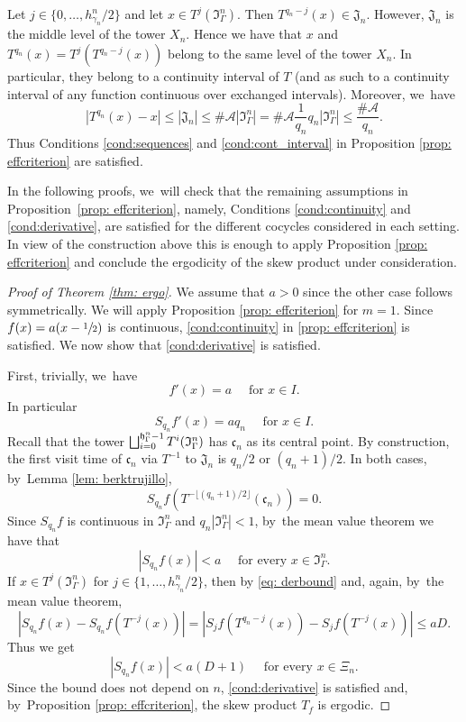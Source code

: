 \documentclass[10pt,a4paper]{amsart}
\let\oldbigsqcup\bigsqcup
\renewcommand{\bigsqcup}{\mathop{\textstyle\oldbigsqcup}\displaylimits}
\theoremstyle{plain}
\theoremstyle{definition}
\newcommand{\A}{\mathcal{A}}
\begin{document}
Let $j\in\{0,\ldots,h_{\gamma_n}^n/2\}$ and let $x\in T^j(\mathfrak I_{\Gamma}^n)$. Then $T^{q_n-j}(x)\in \mathfrak J_n$. However, $\mathfrak J_n$ is the middle level of the tower $X_n$. Hence we have that $x$
and $T^{q_n}(x)=T^{j}(T^{q_n-j}(x))$ belong to the same level of the tower $X_n$. In particular, they belong to a continuity interval of $T$ (and as such to a continuity interval of any function continuous over exchanged intervals). Moreover, we~have
\[
|T^{q_n}(x)-x|\le |\mathfrak J_n|\le \#\A|\mathfrak I_{\Gamma}^n|=
\#\A\frac{1}{q_n} q_n|\mathfrak I_{\Gamma}^n|\le \frac{\#\A}{q_n}.
\]
Thus Conditions \eqref{cond:sequences} and \eqref{cond:cont_interval} in Proposition \ref{prop: effcriterion} are satisfied.

In the following proofs, we~will check that the remaining assumptions in Proposition~\ref{prop: effcriterion}, namely, Conditions \eqref{cond:continuity} and \eqref{cond:derivative}, are satisfied for the different cocycles considered in each setting. In view of the construction above this is enough to apply Proposition \ref{prop: effcriterion} and conclude the ergodicity of the skew product under consideration.

\begin{proof}[Proof of Theorem \ref{thm: ergo}]
We assume that $a>0$ since the other case follows symmetrically. We will apply Proposition \ref{prop: effcriterion} for $m=1$. Since $f(x)=a(x-\sfrac{1}{2})$ is continuous, \eqref{cond:continuity} in \ref{prop: effcriterion} is satisfied. We now show that \eqref{cond:derivative} is satisfied.

First, trivially, we~have
\[
f'(x)=a\quad\text{ for }x\in I.
\]
In particular
\[
S_{q_n} f'(x)=aq_n\quad \text{ for }x\in I.
\]
Recall that the tower $\bigsqcup_{i=0}^{\mathfrak h_{\Gamma}^n-1}T^i(\mathfrak I_{\Gamma}^n)$ has $\mathfrak c_n$ as its central point. By construction, the first visit time of $\mathfrak c_n$ via $T^{-1}$ to $\mathfrak J_n$ is $q_{n}/2$ or $(q_n+1)/2$. In both cases, by~Lemma \ref{lem: berktrujillo},
\[
S_{q_n}f(T^{-\lfloor (q_n+1)/2\rfloor}(\mathfrak c_n))=0.
\]
Since $S_{q_n}f$ is continuous in $\mathfrak I_{\Gamma}^n$ and $q_n|\mathfrak I_{\Gamma}^n|<1$, by~the mean value theorem we have that
\[
\left|S_{q_n}f(x)\right|<a\quad \text{ for every }x\in \mathfrak I_{\Gamma}^n.
\]
If $x\in T^j(\mathfrak I_{\Gamma}^n)$ for $j\in \{1,\ldots,h_{\gamma_n}^n/2\}$, then by \eqref{eq: derbound} and, again, by~the mean value theorem,
\[
\left|S_{q_n}f(x)-S_{q_n}f(T^{-j}(x)) \right|=
\left|S_j f(T^{q_n-j}(x))-S_j f(T^{-j}(x)) \right|
\le a D.
\]
Thus we get
\[
\left|S_{q_n}f(x)\right|<a(D+1) \quad \text{ for every }x\in\Xi_n.
\]
Since the bound does not depend on $n$, \eqref{cond:derivative} is satisfied and, by~Proposition \ref{prop: effcriterion}, the skew product $T_f$ is ergodic.
\end{proof}
\end{document}

